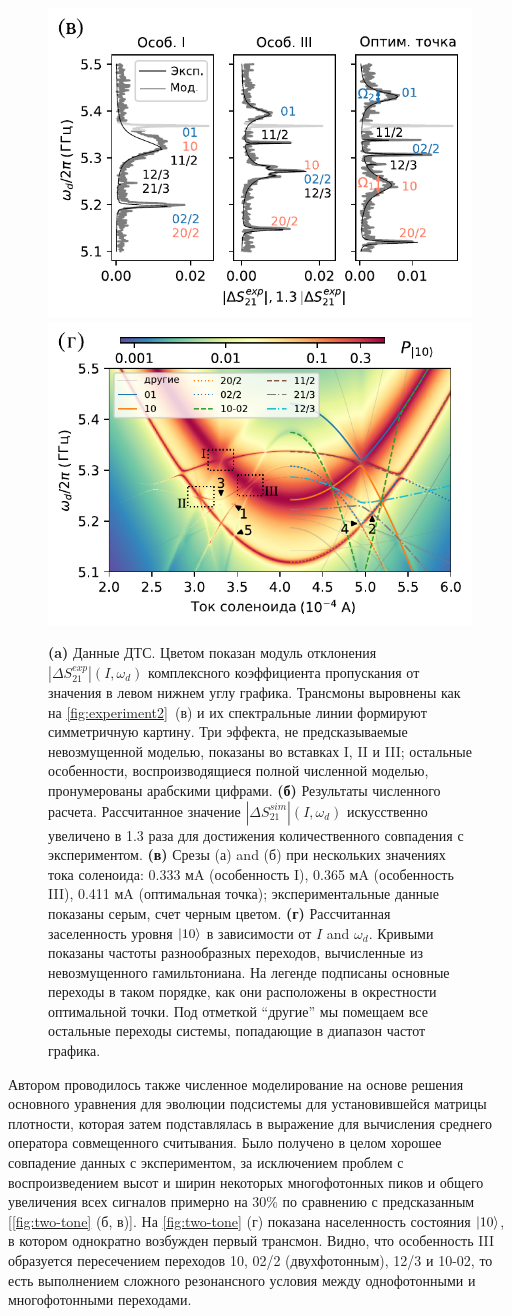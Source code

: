 \documentclass[14pt, a4paper]{extarticle}
\DeclarePairedDelimiter\ket{\lvert}{\rangle}
\begin{document}
\begin{figure}
	\includegraphics[width=.495\linewidth]{main_picture_slices}
	\includegraphics[width=.495\linewidth]{stationary}
	\caption{\textbf{(a)} 
		Данные ДТС. Цветом показан модуль отклонения $|\Delta S^{exp}_{21}| (I, \omega_d)$ комплексного коэффициента пропускания от значения в левом нижнем углу графика. 
		Трансмоны выровнены как на 
		\autoref{fig:experiment2}~(в) и их спектральные линии формируют симметричную картину. Три эффекта, не предсказываемые невозмущенной моделью, показаны во вставках I, II и III; остальные особенности, воспроизводящиеся полной численной моделью, пронумерованы арабскими цифрами. \textbf{(б)} Результаты численного расчета. Рассчитанное значение $|\Delta S^{sim}_{21}| (I, \omega_d)$ искусственно увеличено в 1.3 раза для достижения количественного совпадения с экспериментом.
		\textbf{(в)} Срезы (а) and (б) при нескольких значениях тока соленоида: 0.333 мA (особенность I), 0.365 мA (особенность III), 0.411 мA 
		(оптимальная точка); 
		экспериментальные данные показаны серым, счет черным цветом. \textbf{(г)} Рассчитанная заселенность  
		уровня $\ket{10}$ в зависимости от $I$ and $\omega_d$. Кривыми показаны частоты разнообразных переходов, вычисленные из невозмущенного гамильтониана. На легенде подписаны основные переходы в таком порядке, как они расположены в окрестности оптимальной точки. Под отметкой ``другие'' мы помещаем все остальные переходы системы, попадающие в диапазон частот графика.}
	\label{fig:two-tone}
\end{figure}
Автором проводилось также численное моделирование на основе решения основного уравнения для эволюции подсистемы для установившейся матрицы плотности, которая затем подставлялась в выражение для вычисления среднего оператора совмещенного считывания. Было получено в целом хорошее совпадение данных с экспериментом, за исключением проблем с воспроизведением высот и ширин некоторых многофотонных пиков и общего увеличения всех сигналов примерно на 30\% по сравнению с предсказанным [\autoref{fig:two-tone} (б, в)]. На \autoref{fig:two-tone} (г) показана населенность состояния $\ket{10}$, в котором однократно возбужден первый трансмон. Видно, что особенность III образуется пересечением переходов 10, 02/2 (двухфотонным), 12/3 и 10-02, то есть выполнением сложного резонансного условия между однофотонными и многофотонными переходами.
	
\end{document}
